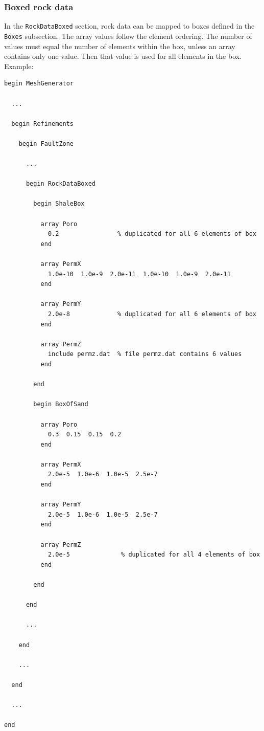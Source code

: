 \subsubsection{Boxed rock data}
\label{sec:lgr-boxed-rock-data}

In the \texttt{RockDataBoxed} section, rock data can be mapped to
boxes defined in the \texttt{Boxes} subsection. The array values
follow the element ordering. The number of values must equal the
number of elements within the box, unless an array contains only one
value. Then that value is used for all elements in the box.  Example:
%
\begin{verbatim}
begin MeshGenerator

  ... 

  begin Refinements

    begin FaultZone

      ... 

      begin RockDataBoxed
    
        begin ShaleBox
    
          array Poro
            0.2                % duplicated for all 6 elements of box
          end
    
          array PermX
            1.0e-10  1.0e-9  2.0e-11  1.0e-10  1.0e-9  2.0e-11
          end
    
          array PermY
            2.0e-8             % duplicated for all 6 elements of box
          end
    
          array PermZ
            include permz.dat  % file permz.dat contains 6 values
          end
    
        end
    
        begin BoxOfSand
    
          array Poro
            0.3  0.15  0.15  0.2
          end
    
          array PermX
            2.0e-5  1.0e-6  1.0e-5  2.5e-7
          end
    
          array PermY
            2.0e-5  1.0e-6  1.0e-5  2.5e-7
          end
    
          array PermZ
            2.0e-5              % duplicated for all 4 elements of box
          end
    
        end
    
      end

      ... 

    end

    ... 

  end

  ... 
    
end
\end{verbatim}



